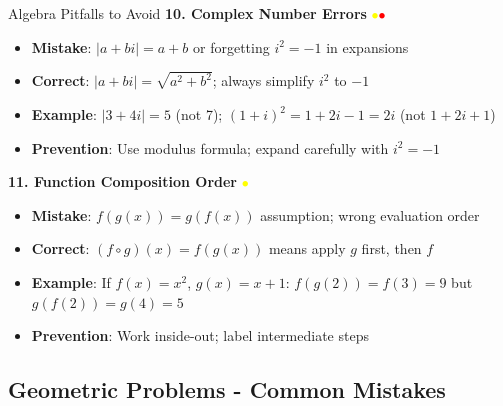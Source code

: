 \documentclass{article}
\begin{document}
\begin{trapbox}{Algebra Pitfalls to Avoid}
\textbf{10. Complex Number Errors} \textcolor{yellow}{$\bullet$}\textcolor{red}{$\bullet$}
\begin{itemize}[nosep]
\item \textbf{Mistake}: $|a+bi| = a+b$ or forgetting $i^2 = -1$ in expansions
\item \textbf{Correct}: $|a+bi| = \sqrt{a^2+b^2}$; always simplify $i^2$ to $-1$
\item \textbf{Example}: $|3+4i| = 5$ (not 7); $(1+i)^2 = 1+2i-1 = 2i$ (not $1+2i+1$)
\item \textbf{Prevention}: Use modulus formula; expand carefully with $i^2 = -1$
\end{itemize}

\textbf{11. Function Composition Order} \textcolor{yellow}{$\bullet$}
\begin{itemize}[nosep]
\item \textbf{Mistake}: $f(g(x)) = g(f(x))$ assumption; wrong evaluation order
\item \textbf{Correct}: $(f \circ g)(x) = f(g(x))$ means apply $g$ first, then $f$
\item \textbf{Example}: If $f(x)=x^2$, $g(x)=x+1$: $f(g(2))=f(3)=9$ but $g(f(2))=g(4)=5$
\item \textbf{Prevention}: Work inside-out; label intermediate steps
\end{itemize}
\end{trapbox}

\subsection{Geometric Problems - Common Mistakes}
\end{document}
